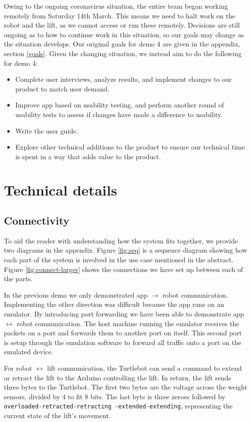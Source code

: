 \documentclass{article}
\begin{document}
Owing to the ongoing coronavirus situation, the entire team began working remotely from Saturday 14th March. This means we need to halt work on the robot and the lift, as we cannot access or run these remotely. Decisions are still ongoing as to how to continue work in this situation, so our goals may change as the situation develops. Our original goals for demo 4 are given in the appendix, section \ref{goals}. Given the changing situation, we instead aim to do the following for demo 4:
\begin{itemize}
  \item Complete user interviews, analyze results, and implement changes to our product to match user demand.
  \item Improve app based on usability testing, and perform another round of usability tests to assess if changes have made a difference to usability. 
  \item Write the user guide. 
  \item Explore other technical additions to the product to ensure our technical time is spent in a way that adds value to the product. 
\end{itemize}

\section{Technical details}
\subsection{Connectivity}
To aid the reader with understanding how the system fits together, we provide two diagrams in the appendix. Figure \ref{fig:seq} is a sequence diagram showing how each part of the system is involved in the use case mentioned in the abstract. Figure \ref{fig:connect-larger} shows the connections we have set up between each of the parts. 

In the previous demo we only demonstrated app $\rightarrow$ robot communication. Implementing the other direction was difficult because the app runs on an emulator. By introducing port forwarding we have been able to demonstrate app $\leftrightarrow$ robot communication. The host machine running the emulator receives the packets on a port and forwards them to another port on itself. This second port is setup through the emulation software to forward all traffic onto a port on the emulated device.

For robot $\leftrightarrow$ lift communication, the Turtlebot can send a command to extend or retract the lift to the Arduino controlling the lift. In return, the lift sends three bytes to the Turtlebot. The first two bytes are the voltage across the weight sensors, divided by 4 to fit 8 bits. The last byte is three zeroes followed by {\tt overloaded-retracted-retracting}\ {\tt -extended-extending}, representing the current state of the lift's movement.
\end{document}
